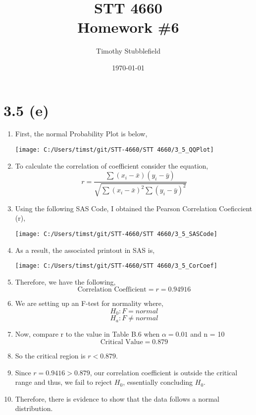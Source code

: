 \documentclass{article}
\title{STT 4660 \\ Homework \#6}
\author{Timothy Stubblefield}
\date{\today}
\begin{document}
	
\maketitle

\section*{3.5 (e)}
	\begin{enumerate}[label = \arabic*)]
		\item First, the normal Probability Plot is below,
		
		\texttt{[image: C:/Users/timst/git/STT-4660/STT 4660/3\_5\_QQPlot]}
		\item To calculate the correlation of coefficient consider the equation,
		\[r = \frac{\sum(x_i - \bar{x})(y_i - \bar{y})}{\sqrt{\sum (x_i - \bar{x})^2 \sum (y_i - \bar{y})^2}}\]
		\item Using the following SAS Code, I obtained the Pearson Correlation Coeficcient (r),
	
		\texttt{[image: C:/Users/timst/git/STT-4660/STT 4660/3\_5\_SASCode]}
		\item As a result, the associated printout in SAS is,
		
		\texttt{[image: C:/Users/timst/git/STT-4660/STT 4660/3\_5\_CorCoef]}
		\item Therefore, we have the following,
		\[\text{Correlation Coefficient} = r = 0.94916\]
		\item We are setting up an F-test for normality where,
		\[H_0: F = normal\]
		\[H_a: F \neq normal\]
		\item Now, compare r to the value in Table B.6 when $\alpha = 0.01$ and n = 10
		\[\text{Critical Value} = 0.879\]
		\item So the critical region is $r < 0.879$.
		\item Since $r = 0.9416 > 0.879$, our correlation coefficient is outside the critical range and thus, we fail to reject $H_0$, essentially concluding $H_0$.
		\item Therefore, there is evidence to show that the data follows a normal distribution.
	\end{enumerate}
\end{document}
